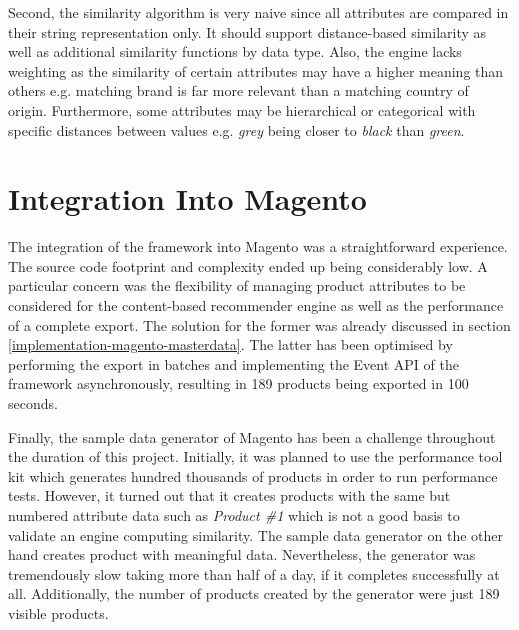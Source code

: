 Second, the similarity algorithm is very naive since all attributes are compared in their string representation only. It should support distance-based similarity as well as additional similarity functions by data type. Also, the engine lacks weighting as the similarity of certain attributes may have a higher meaning than others e.g. matching brand is far more relevant than a matching country of origin. Furthermore, some attributes may be hierarchical or categorical with specific distances between values e.g. \emph{grey} being closer to \emph{black} than \emph{green}.

\section{Integration Into Magento}
\label{evaluation-domain}

The integration of the framework into Magento was a straightforward experience. The source code footprint and complexity ended up being considerably low. A particular concern was the flexibility of managing product attributes to be considered for the content-based recommender engine as well as the performance of a complete export. The solution for the former was already discussed in section \ref{implementation-magento-masterdata}. The latter has been optimised by performing the export in batches and implementing the Event API of the framework asynchronously, resulting in 189 products being exported in 100 seconds.

Finally, the sample data generator of Magento has been a challenge throughout the duration of this project. Initially, it was planned to use the performance tool kit which generates hundred thousands of products in order to run performance tests. However, it turned out that it creates products with the same but numbered attribute data such as \emph{Product \#1} which is not a good basis to validate an engine computing similarity. The sample data generator on the other hand creates product with meaningful data. Nevertheless, the generator was tremendously slow taking more than half of a day, if it completes successfully at all. Additionally, the number of products created by the generator were just 189 visible products.